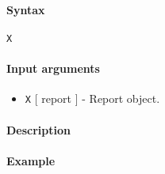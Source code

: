


	\paragraph{Syntax}\label{syntax}

\begin{verbatim}
X
\end{verbatim}

\paragraph{Input arguments}\label{input-arguments}

\begin{itemize}
\itemsep1pt\parskip0pt
\item
  \texttt{X} {[} report {]} - Report object.
\end{itemize}

\paragraph{Description}\label{description}

\paragraph{Example}\label{example}


